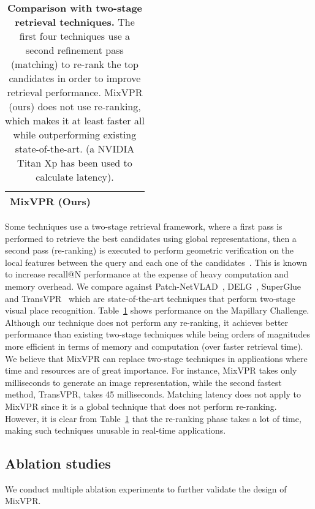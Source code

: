 \documentclass[10pt,twocolumn,letterpaper]{article}
\begin{document}
\begin{table}[t]
{\begin{tabular}{|l|c|c|ccc|}
\textbf{MixVPR (Ours)}                &                                                                                  &                                                                               &  &  &  \\ \hline
\end{tabular}}
\caption{\textbf{Comparison with two-stage retrieval techniques.} The first four techniques use a second refinement pass (matching) to re-rank the top candidates in order to improve retrieval performance. MixVPR (ours) does not use re-ranking, which makes it at least  faster all while outperforming existing state-of-the-art. (a NVIDIA Titan Xp has been used to calculate latency).}
\label{tab:two-stage}
\end{table}
Some techniques use a two-stage retrieval framework, where a first pass is performed to retrieve the best  candidates using global representations, then a second pass (re-ranking) is executed to perform geometric verification on the local features between the query and each one of the  candidates~\cite{wang2022transvpr}. This is known to increase recall@N performance at the expense of heavy computation and memory overhead. We compare against Patch-NetVLAD~\cite{hausler2021patch}, DELG~\cite{cao2020unifying}, SuperGlue~\cite{sarlin2020superglue} and TransVPR~\cite{hausler2021patch} which are state-of-the-art techniques that perform two-stage visual place recognition. Table~\ref{tab:two-stage} shows performance on the Mapillary Challenge. Although our technique does not perform any re-ranking, it achieves better performance than existing two-stage techniques while being orders of magnitudes more efficient in terms of memory and computation (over  faster retrieval time). We believe that MixVPR can replace two-stage techniques in applications where time and resources are of great importance. For instance, MixVPR takes only  milliseconds to generate an image representation, while the second fastest method, TransVPR, takes 45 milliseconds. Matching latency does not apply to MixVPR since it is a global technique that does not perform re-ranking. However, it is clear from Table~\ref{tab:two-stage} that the re-ranking phase takes a lot of time, making such techniques unusable in real-time applications.


\subsection{Ablation studies}\label{sec:exp:ablation}
We conduct multiple ablation experiments to further validate the design of MixVPR.
\end{document}
